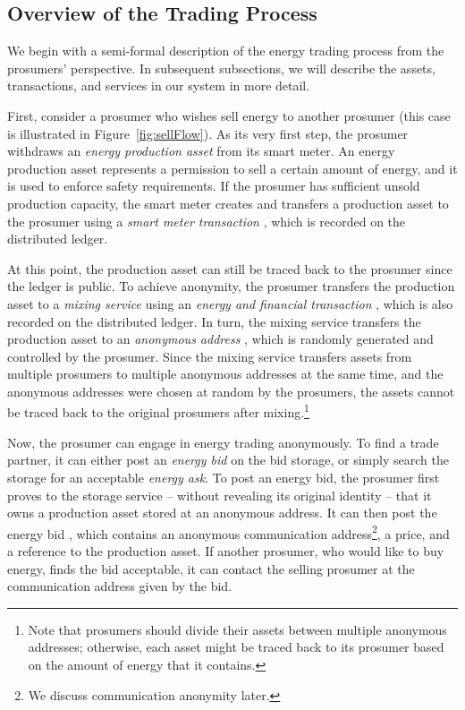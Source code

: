 \subsection{Overview of the Trading Process}
We begin with a semi-formal description of the energy trading process from the prosumers' perspective.
In subsequent subsections, we will describe the assets, transactions, and services in our system in more detail.

First, consider a prosumer who wishes sell energy to another prosumer (this case is illustrated in Figure~\ref{fig:sellFlow}).
As its very first step, the prosumer withdraws an \emph{energy production asset} from its smart meter.
An energy production asset represents a permission to sell a certain amount of energy, and it is used to enforce safety requirements.
If the prosumer has sufficient unsold production capacity, the smart meter creates and transfers a production asset to the prosumer using a \emph{smart meter transaction} , which is recorded on the distributed ledger.

At this point, the production asset can still be traced back to the prosumer since the ledger is public.
To achieve anonymity, the prosumer transfers the production asset to a \emph{mixing service} using an \emph{energy and financial transaction} , which is also recorded on the distributed ledger.
In turn, the mixing service transfers the production asset to an \emph{anonymous address} , which is randomly generated and controlled by the prosumer.
Since the mixing service transfers assets from multiple prosumers to multiple anonymous addresses at the same time, and the anonymous addresses were chosen at random by the prosumers, the assets cannot be traced back to the original prosumers after mixing.\footnote{Note that prosumers should divide their assets between multiple anonymous addresses; otherwise, each asset might be traced back to its prosumer based on the amount of energy that it contains.}

Now, the prosumer can engage in energy trading anonymously.
To find a trade partner, it can either post an \emph{energy bid} on the bid storage, or simply search the storage for an acceptable \emph{energy ask}.
To post an energy bid, the prosumer first proves to the storage service -- without revealing its original identity -- that it owns a production asset stored at an anonymous address.
It can then post the energy bid , which contains an anonymous communication address\footnote{We discuss communication anonymity later.}, a price, and a reference to the production asset.
If another prosumer, who would like to buy energy, finds the bid acceptable, it can contact the selling prosumer at the communication address given by the bid.

